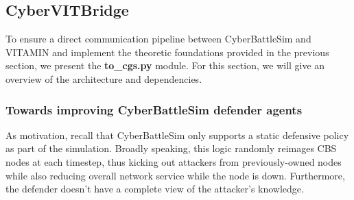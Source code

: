 \subsection{CyberVITBridge}

To ensure a direct communication pipeline between CyberBattleSim and VITAMIN and implement the theoretic foundations provided in the previous section, we present the \textbf{to\_cgs.py} module. For this section, we will give an overview of the architecture and dependencies.

\subsubsection{Towards improving CyberBattleSim defender agents}
As motivation, recall that CyberBattleSim only supports a static defensive policy as part of the simulation. Broadly speaking, this logic randomly reimages CBS nodes at each timestep, thus kicking out attackers from previously-owned nodes while also reducing overall network service while the node is down. Furthermore, the defender doesn't have a complete view of the attacker's knowledge.

